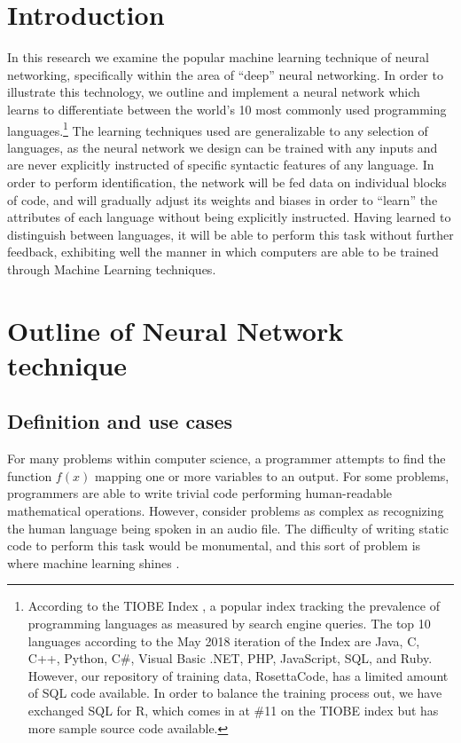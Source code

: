 \documentclass{article}
\begin{document}
\section{Introduction}
In this research we examine the popular machine learning technique of neural networking, specifically within the area of ``deep'' neural networking. In order to illustrate this technology, we outline and implement a neural network which learns to differentiate between the world's 10 most commonly used programming languages.\footnote{According to the TIOBE Index \cite{tiobe}, a popular index tracking the prevalence of programming languages as measured by search engine queries. The top 10 languages according to the May 2018 iteration of the Index are Java, C, C++, Python, C\#, Visual Basic .NET, PHP, JavaScript, SQL, and Ruby. However, our repository of training data, RosettaCode, has a limited amount of SQL code available. In order to balance the training process out, we have exchanged SQL for R, which comes in at \#11 on the TIOBE index but has more sample source code available.} The learning techniques used are generalizable to any selection of languages, as the neural network we design can be trained with any inputs and are never explicitly instructed of specific syntactic features of any language. In order to perform identification, the network will be fed data on individual blocks of code, and will gradually adjust its weights and biases in order to ``learn'' the attributes of each language without being explicitly instructed. Having learned to distinguish between languages, it will be able to perform this task without further feedback, exhibiting well the manner in which computers are able to be trained through Machine Learning techniques.

\section{Outline of Neural Network technique}
\subsection{Definition and use cases}
For many problems within computer science, a programmer attempts to find the function $f(x)$ mapping one or more variables to an output. For some problems, programmers are able to write trivial code performing human-readable mathematical operations. However, consider problems as complex as recognizing the human language being spoken in an audio file. The difficulty of writing static code to perform this task would be monumental, and this sort of problem is where machine learning shines \cite{10algos}.
\end{document}
